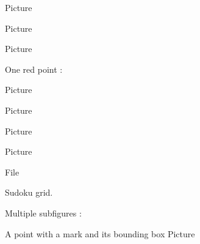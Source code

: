 \clearpage

Picture 
\begin{center}
   
\end{center}
   


\clearpage

Picture 
\begin{center}
   
\end{center}
   

Picture 
   \begin{center}
       
   \end{center}
       


One red point :

Picture 
\begin{center}
   
\end{center}

Picture 
\begin{center}

\end{center}


Picture 
\begin{center}

\end{center}




Picture 
\begin{center}

\end{center}


File 
\begin{center}
   
\end{center}
   

Sudoku grid.

\begin{center}
   
\end{center}
   

   \clearpage

Multiple subfigures :

A point with a mark and its bounding box
Picture 
\Huge


